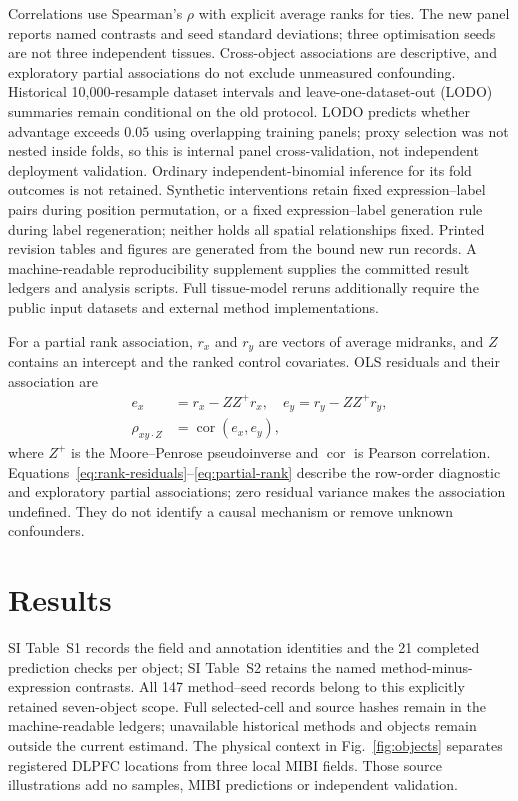 \documentclass[11pt]{article}
\begin{document}
Correlations use Spearman's $\rho$ with explicit average ranks for ties. The new panel reports named contrasts and seed standard deviations; three optimisation seeds are not three independent tissues. Cross-object associations are descriptive, and exploratory partial associations do not exclude unmeasured confounding. Historical 10{,}000-resample dataset intervals and leave-one-dataset-out (LODO) summaries remain conditional on the old protocol. LODO predicts whether advantage exceeds $0.05$ using overlapping training panels; proxy selection was not nested inside folds, so this is internal panel cross-validation, not independent deployment validation. Ordinary independent-binomial inference for its fold outcomes is not retained. Synthetic interventions retain fixed expression--label pairs during position permutation, or a fixed expression--label generation rule during label regeneration; neither holds all spatial relationships fixed. Printed revision tables and figures are generated from the bound new run records. A machine-readable reproducibility
supplement supplies the committed result ledgers and analysis scripts. Full tissue-model reruns additionally require the public input datasets and external method implementations.

For a partial rank association, $r_x$ and $r_y$ are vectors of average
midranks, and $Z$ contains an intercept and the ranked control covariates.
OLS residuals and their association are
\begin{align}
e_x&=r_x-ZZ^+r_x,\quad e_y=r_y-ZZ^+r_y,\label{eq:rank-residuals}\\
\rho_{xy\cdot Z}&=\operatorname{cor}(e_x,e_y),\label{eq:partial-rank}
\end{align}
where $Z^+$ is the Moore--Penrose pseudoinverse and $\operatorname{cor}$
is Pearson correlation. Equations~\ref{eq:rank-residuals}--\ref{eq:partial-rank}
describe the row-order diagnostic and exploratory partial associations;
zero residual variance makes the association undefined. They do not
identify a causal mechanism or remove unknown confounders.

\section{Results}


SI Table~S1 records the field and annotation identities and the 21
completed prediction checks per object; SI Table~S2 retains the named
method-minus-expression contrasts. All 147 method--seed records belong to
this explicitly retained seven-object scope. Full selected-cell and source
hashes remain in the machine-readable ledgers; unavailable historical
methods and objects remain outside the current estimand. The physical
context in Fig.~\ref{fig:objects} separates registered DLPFC locations
from three local MIBI fields. Those source illustrations add no samples,
MIBI predictions or independent validation.
\end{document}
